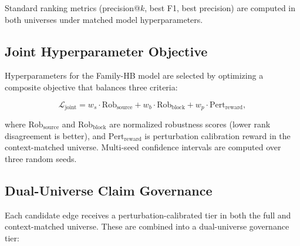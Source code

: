 \documentclass[11pt,a4paper]{article}
\begin{document}
Standard ranking metrics (precision@$k$, best F1, best precision) are computed in both universes under matched model hyperparameters.

\subsection{Joint Hyperparameter Objective}\label{sec:joint}

Hyperparameters for the Family-HB model are selected by optimizing a composite objective that balances three criteria:

\begin{equation}
  \mathcal{L}_{\text{joint}} = w_s \cdot \text{Rob}_{\text{source}} + w_b \cdot \text{Rob}_{\text{block}} + w_p \cdot \text{Pert}_{\text{reward}},
\end{equation}

\noindent where $\text{Rob}_{\text{source}}$ and $\text{Rob}_{\text{block}}$ are normalized robustness scores (lower rank disagreement is better), and $\text{Pert}_{\text{reward}}$ is perturbation calibration reward in the context-matched universe.
Multi-seed confidence intervals are computed over three random seeds.

\subsection{Dual-Universe Claim Governance}\label{sec:governance}

Each candidate edge receives a perturbation-calibrated tier in both the full and context-matched universe.
These are combined into a dual-universe governance tier:
\end{document}
